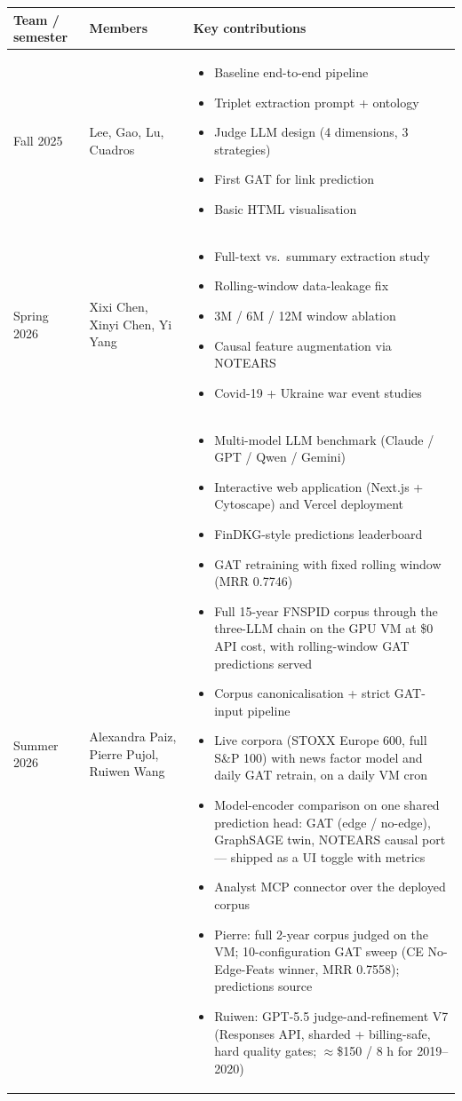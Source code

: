 \documentclass[11pt]{article}
\begin{document}
\begin{longtable}{p{} p{} p{}}
\toprule
\textbf{Team / semester} & \textbf{Members} & \textbf{Key contributions} \\
\midrule
Fall 2025 & Lee, Gao, Lu, Cuadros & \begin{itemize}
    \item Baseline end-to-end pipeline
    \item Triplet extraction prompt + ontology
    \item Judge LLM design (4 dimensions, 3 strategies)
    \item First GAT for link prediction
    \item Basic HTML visualisation
  \end{itemize} \\
\midrule
Spring 2026 & Xixi Chen, Xinyi Chen, Yi Yang & \begin{itemize}
    \item Full-text vs.\ summary extraction study
    \item Rolling-window data-leakage fix
    \item 3M / 6M / 12M window ablation
    \item Causal feature augmentation via NOTEARS
    \item Covid-19 + Ukraine war event studies
  \end{itemize} \\
\midrule
Summer 2026 & Alexandra Paiz, Pierre Pujol, Ruiwen Wang & \begin{itemize}
    \item Multi-model LLM benchmark (Claude / GPT / Qwen / Gemini)
    \item Interactive web application (Next.js + Cytoscape) and Vercel deployment
    \item FinDKG-style predictions leaderboard
    \item GAT retraining with fixed rolling window (MRR 0.7746)
    \item Full 15-year FNSPID corpus through the three-LLM chain on the GPU VM at \$0 API cost, with rolling-window GAT predictions served
    \item Corpus canonicalisation + strict GAT-input pipeline
    \item Live corpora (STOXX Europe 600, full S\&P 100) with news factor model and daily GAT retrain, on a daily VM cron
    \item Model-encoder comparison on one shared prediction head: GAT (edge / no-edge), GraphSAGE twin, NOTEARS causal port --- shipped as a UI toggle with metrics
    \item Analyst MCP connector over the deployed corpus
    \item Pierre: full 2-year corpus judged on the VM; 10-configuration GAT sweep (CE No-Edge-Feats winner, MRR 0.7558); predictions source
    \item Ruiwen: GPT-5.5 judge-and-refinement V7 (Responses API, sharded + billing-safe, hard quality gates; \(\approx\)\$150 / 8 h for 2019--2020)
  \end{itemize} \\
\bottomrule
\end{longtable}
\end{document}
